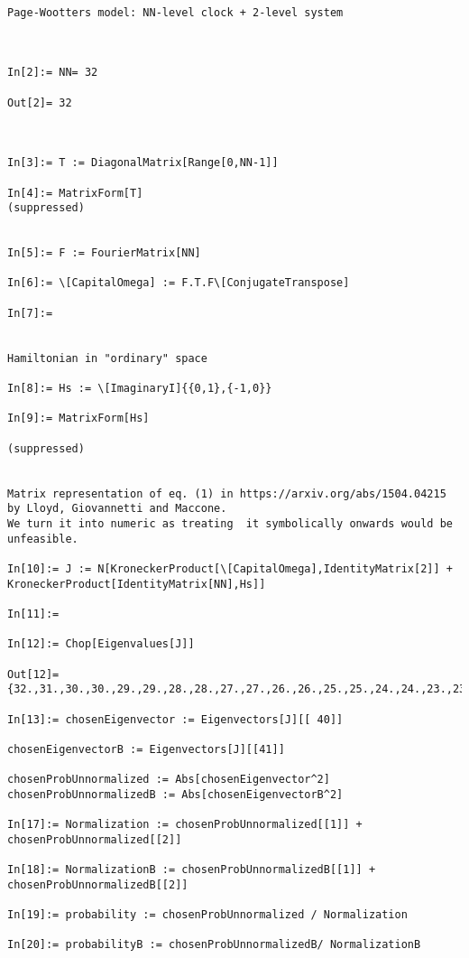 \begin{lstlisting}

Page-Wootters model: NN-level clock + 2-level system



In[2]:= NN= 32

Out[2]= 32



In[3]:= T := DiagonalMatrix[Range[0,NN-1]]

In[4]:= MatrixForm[T]
(suppressed)


In[5]:= F := FourierMatrix[NN]

In[6]:= \[CapitalOmega] := F.T.F\[ConjugateTranspose] 

In[7]:= 


Hamiltonian in "ordinary" space

In[8]:= Hs := \[ImaginaryI]{{0,1},{-1,0}}

In[9]:= MatrixForm[Hs]

(suppressed)


Matrix representation of eq. (1) in https://arxiv.org/abs/1504.04215 by Lloyd, Giovannetti and Maccone.
We turn it into numeric as treating  it symbolically onwards would be unfeasible.

In[10]:= J := N[KroneckerProduct[\[CapitalOmega],IdentityMatrix[2]] + KroneckerProduct[IdentityMatrix[NN],Hs]]

In[11]:= 

In[12]:= Chop[Eigenvalues[J]]

Out[12]= {32.,31.,30.,30.,29.,29.,28.,28.,27.,27.,26.,26.,25.,25.,24.,24.,23.,23.,22.,22.,21.,21.,20.,20.,19.,19.,18.,18.,17.,17.,16.,16.,15.,15.,14.,14.,13.,13.,12.,12.,11.,11.,10.,10.,9.,9.,8.,8.,7.,7.,6.,6.,5.,5.,4.,4.,3.,3.,2.,2.,1.,1.,-1.,0}

In[13]:= chosenEigenvector := Eigenvectors[J][[ 40]]

chosenEigenvectorB := Eigenvectors[J][[41]]

chosenProbUnnormalized := Abs[chosenEigenvector^2]
chosenProbUnnormalizedB := Abs[chosenEigenvectorB^2]

In[17]:= Normalization := chosenProbUnnormalized[[1]] + chosenProbUnnormalized[[2]]

In[18]:= NormalizationB := chosenProbUnnormalizedB[[1]] + chosenProbUnnormalizedB[[2]]

In[19]:= probability := chosenProbUnnormalized / Normalization

In[20]:= probabilityB := chosenProbUnnormalizedB/ NormalizationB


\end{lstlisting}
